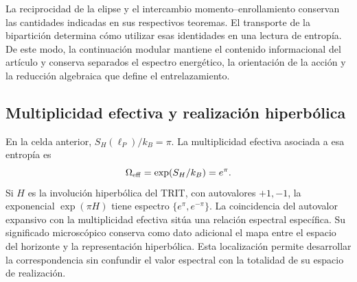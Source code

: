 La reciprocidad de la elipse y el intercambio momento--enrollamiento
conservan las cantidades indicadas en sus respectivos teoremas. El
transporte de la bipartición determina cómo utilizar esas identidades
en una lectura de entropía. De este modo, la continuación modular
mantiene el contenido informacional del artículo y conserva separados
el espectro energético, la orientación de la acción y la reducción
algebraica que define el entrelazamiento.

\subsection{Multiplicidad efectiva y realización hiperbólica}

En la celda anterior, \(S_H(\ell_P)/k_B=\pi\). La multiplicidad
efectiva asociada a esa entropía es
\[
 \Omega_{\rm eff}=\exp(S_H/k_B)=e^\pi.
\]
Si \(H\) es la involución hiperbólica del TRIT, con autovalores
\(+1,-1\), la exponencial \(\exp(\pi H)\) tiene espectro
\(\{e^\pi,e^{-\pi}\}\). La coincidencia del autovalor expansivo
con la multiplicidad efectiva sitúa una relación espectral específica.
Su significado microscópico conserva como dato adicional el mapa entre
el espacio del horizonte y la representación hiperbólica. Esta
localización permite desarrollar la correspondencia sin confundir
el valor espectral con la totalidad de su espacio de realización.
